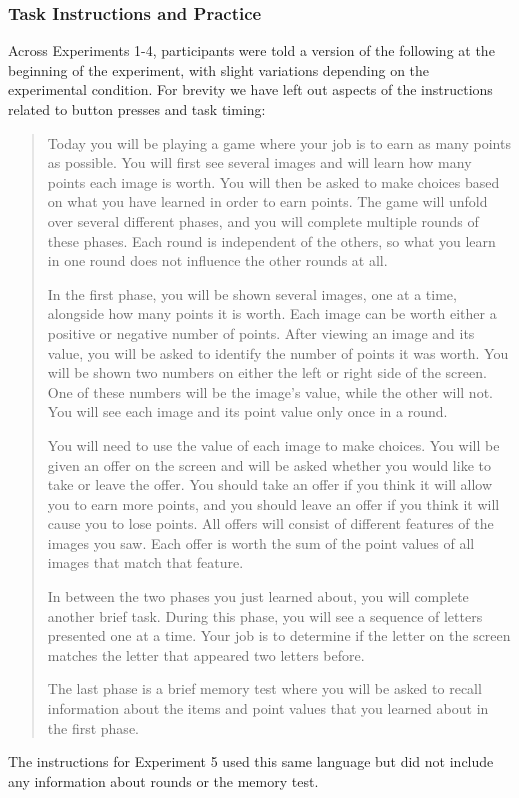 \documentclass[10pt,letterpaper]{article}
\begin{document}
\subsubsection{Task Instructions and Practice}

Across Experiments 1-4, participants were told a version of the following at the beginning of the experiment, with slight variations depending on the experimental condition. For brevity we have left out aspects of the instructions related to button presses and task timing:
\begin{quotation}
  Today you will be playing a game where your job is to earn as many points as possible. You will first see several images and will learn how many points each image is worth. You will then be asked to make choices based on what you have learned in order to earn points. The game will unfold over several different phases, and you will complete multiple rounds of these phases. Each round is independent of the others, so what you learn in one round does not influence the other rounds at all.
  
  In the first phase, you will be shown several images, one at a time, alongside how many points it is worth. Each image can be worth either a positive or negative number of points. After viewing an image and its value, you will be asked to identify the number of points it was worth. You will be shown two numbers on either the left or right side of the screen. One of these numbers will be the image's value, while the other will not. You will see each image and its point value only once in a round.

  You will need to use the value of each image to make choices. You will be given an offer on the screen and will be asked whether you would like to take or leave the offer. You should take an offer if you think it will allow you to earn more points, and you should leave an offer if you think it will cause you to lose points. All offers will consist of different features of the images you saw. Each offer is worth the sum of the point values of all images that match that feature.

  In between the two phases you just learned about, you will complete another brief task. During this phase, you will see a sequence of letters presented one at a time. Your job is to determine if the letter on the screen matches the letter that appeared two letters before.

  The last phase is a brief memory test where you will be asked to recall information about the items and point values that you learned about in the first phase.
\end{quotation}
The instructions for Experiment 5 used this same language but did not include any information about rounds or the memory test.
\end{document}
